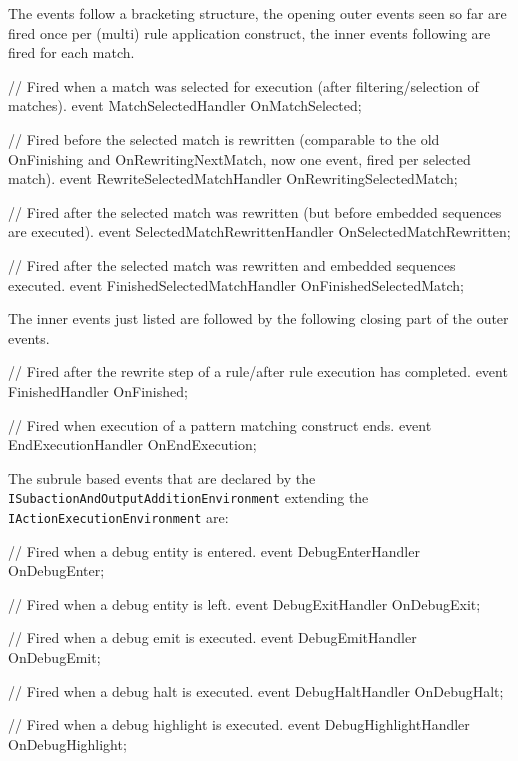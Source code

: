 The events follow a bracketing structure, the opening outer events seen so far are fired once per (multi) rule application construct, the inner events following are fired for each match.

\begin{csharplet}
// Fired when a match was selected for execution (after filtering/selection of matches).
event MatchSelectedHandler OnMatchSelected;

// Fired before the selected match is rewritten (comparable to the old OnFinishing and OnRewritingNextMatch, now one event, fired per selected match).
event RewriteSelectedMatchHandler OnRewritingSelectedMatch;

// Fired after the selected match was rewritten (but before embedded sequences are executed).
event SelectedMatchRewrittenHandler OnSelectedMatchRewritten;

// Fired after the selected match was rewritten and embedded sequences executed.
event FinishedSelectedMatchHandler OnFinishedSelectedMatch;
\end{csharplet}

The inner events just listed are followed by the following closing part of the outer events.

\begin{csharplet}
// Fired after the rewrite step of a rule/after rule execution has completed.
event FinishedHandler OnFinished;

// Fired when execution of a pattern matching construct ends.
event EndExecutionHandler OnEndExecution;
\end{csharplet}

The subrule based events that are declared by the \texttt{ISubaction\-And\-Output\-Addition\-Environment} extending the \texttt{IActionExecutionEnvironment} are:

\begin{csharplet}
// Fired when a debug entity is entered.
event DebugEnterHandler OnDebugEnter;

// Fired when a debug entity is left.
event DebugExitHandler OnDebugExit;

// Fired when a debug emit is executed.
event DebugEmitHandler OnDebugEmit;

// Fired when a debug halt is executed.
event DebugHaltHandler OnDebugHalt;

// Fired when a debug highlight is executed.
event DebugHighlightHandler OnDebugHighlight;
\end{csharplet}

